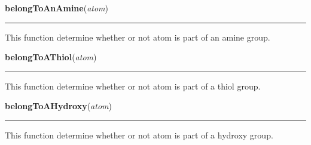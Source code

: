     \label{nMOLDYN:Core:Chemistry:belongToAnAmine}

    \vspace{0.5ex}

\hspace{.8\funcindent}\begin{boxedminipage}{\funcwidth}

    \raggedright \textbf{belongToAnAmine}(\textit{atom})

    \vspace{-1.5ex}

    \rule{\textwidth}{0.5\fboxrule}
\setlength{\parskip}{2ex}
    This function determine whether or not {\textbar}atom{\textbar} is part
    of an amine group.

\setlength{\parskip}{1ex}
    \end{boxedminipage}

    \label{nMOLDYN:Core:Chemistry:belongToAThiol}

    \vspace{0.5ex}

\hspace{.8\funcindent}\begin{boxedminipage}{\funcwidth}

    \raggedright \textbf{belongToAThiol}(\textit{atom})

    \vspace{-1.5ex}

    \rule{\textwidth}{0.5\fboxrule}
\setlength{\parskip}{2ex}
    This function determine whether or not {\textbar}atom{\textbar} is part
    of a thiol group.

\setlength{\parskip}{1ex}
    \end{boxedminipage}

    \label{nMOLDYN:Core:Chemistry:belongToAHydroxy}

    \vspace{0.5ex}

\hspace{.8\funcindent}\begin{boxedminipage}{\funcwidth}

    \raggedright \textbf{belongToAHydroxy}(\textit{atom})

    \vspace{-1.5ex}

    \rule{\textwidth}{0.5\fboxrule}
\setlength{\parskip}{2ex}
    This function determine whether or not {\textbar}atom{\textbar} is part
    of a hydroxy group.

\setlength{\parskip}{1ex}
    \end{boxedminipage}

